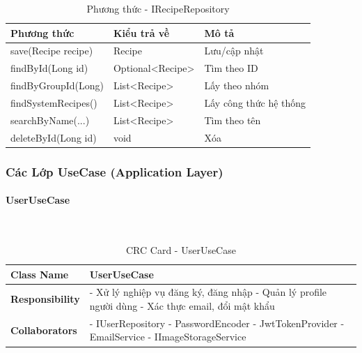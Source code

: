 \begin{table}[H]
\small
\renewcommand{\arraystretch}{1.3}
\begin{tabularx}{\textwidth}{|>{\raggedright\arraybackslash}p{5cm}|>{\raggedright\arraybackslash}p{3cm}|X|}
\hline
\rowcolor{gray!20}
\textbf{Phương thức} & \textbf{Kiểu trả về} & \textbf{Mô tả} \\
\hline
save(Recipe recipe) & Recipe & Lưu/cập nhật \\
\hline
findById(Long id) & Optional<Recipe> & Tìm theo ID \\
\hline
findByGroupId(Long) & List<Recipe> & Lấy theo nhóm \\
\hline
findSystemRecipes() & List<Recipe> & Lấy công thức hệ thống \\
\hline
searchByName(...) & List<Recipe> & Tìm theo tên \\
\hline
deleteById(Long id) & void & Xóa \\
\hline
\end{tabularx}
\caption{Phương thức - IRecipeRepository}
\end{table}

\subsubsection{Các Lớp UseCase (Application Layer)}

\paragraph{UserUseCase} ~\\

\begin{table}[H]
\small
\renewcommand{\arraystretch}{1.3}
\begin{tabularx}{\textwidth}{|>{\raggedright\arraybackslash}p{3.5cm}|X|}
\hline
\rowcolor{gray!20}
\textbf{Class Name} & UserUseCase \\
\hline
\textbf{Responsibility} & - Xử lý nghiệp vụ đăng ký, đăng nhập \newline - Quản lý profile người dùng \newline - Xác thực email, đổi mật khẩu \\
\hline
\textbf{Collaborators} & - IUserRepository \newline - PasswordEncoder \newline - JwtTokenProvider \newline - EmailService \newline - IImageStorageService \\
\hline
\end{tabularx}
\caption{CRC Card - UserUseCase}
\end{table}

